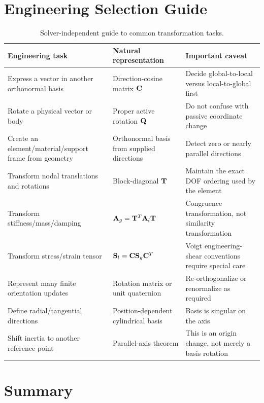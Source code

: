 \section{Engineering Selection Guide}

\begin{table}[ht]
\centering
\renewcommand{\arraystretch}{1.18}
\begin{tabular}{|p{}|p{}|p{}|}
\hline
\textbf{Engineering task} & \textbf{Natural representation} & \textbf{Important caveat}\\ \hline
Express a vector in another orthonormal basis & Direction-cosine matrix $\mathbf{C}$ & Decide global-to-local versus local-to-global first\\ \hline
Rotate a physical vector or body & Proper active rotation $\mathbf{Q}$ & Do not confuse with passive coordinate change\\ \hline
Create an element/material/support frame from geometry & Orthonormal basis from supplied directions & Detect zero or nearly parallel directions\\ \hline
Transform nodal translations and rotations & Block-diagonal $\mathbf{T}$ & Maintain the exact DOF ordering used by the element\\ \hline
Transform stiffness/mass/damping & $\mathbf{A}_g=\mathbf{T}^T\mathbf{A}_l\mathbf{T}$ & Congruence transformation, not similarity transformation\\ \hline
Transform stress/strain tensor & $\mathbf{S}_l=\mathbf{C}\mathbf{S}_g\mathbf{C}^T$ & Voigt engineering-shear conventions require special care\\ \hline
Represent many finite orientation updates & Rotation matrix or unit quaternion & Re-orthogonalize or renormalize as required\\ \hline
Define radial/tangential directions & Position-dependent cylindrical basis & Basis is singular on the axis\\ \hline
Shift inertia to another reference point & Parallel-axis theorem & This is an origin change, not merely a basis rotation\\ \hline
\end{tabular}
\caption{Solver-independent guide to common transformation tasks.}
\label{tab:coord-selection-guide}
\end{table}

\section{Summary}

